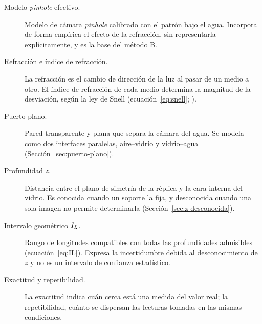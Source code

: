 \begin{description}
  \item[Modelo \emph{pinhole} efectivo.] Modelo de cámara \emph{pinhole} calibrado con el patrón bajo el agua. Incorpora de forma empírica el efecto de la refracción, sin representarla explícitamente, y es la base del método B.
  \item[Refracción e índice de refracción.] La refracción es el cambio de dirección de la luz al pasar de un medio a otro. El índice de refracción de cada medio determina la magnitud de la desviación, según la ley de Snell (ecuación~\ref{eq:snell}; \cite{Hecht2017}).
  \item[Puerto plano.] Pared transparente y plana que separa la cámara del agua. Se modela como dos interfaces paralelas, aire--vidrio y vidrio--agua (Sección~\ref{sec:puerto-plano}).
  \item[Profundidad $z$.] Distancia entre el plano de simetría de la réplica y la cara interna del vidrio. Es conocida cuando un soporte la fija, y desconocida cuando una sola imagen no permite determinarla (Sección~\ref{sec:z-desconocida}).
  \item[Intervalo geométrico $I_L$.] Rango de longitudes compatibles con todas las profundidades admisibles (ecuación~\ref{eq:IL}). Expresa la incertidumbre debida al desconocimiento de $z$ y no es un intervalo de confianza estadístico.
  \item[Exactitud y repetibilidad.] La exactitud indica cuán cerca está una medida del valor real; la repetibilidad, cuánto se dispersan las lecturas tomadas en las mismas condiciones.
\end{description}
